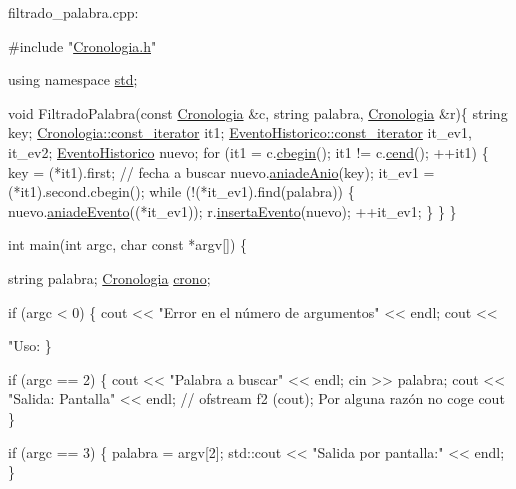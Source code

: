  filtrado\+\_\+palabra.\+cpp\+: 
\begin{DoxyCodeInclude}

\textcolor{preprocessor}{#include "\hyperlink{Cronologia_8h}{Cronologia.h}"}

\textcolor{keyword}{using namespace }\hyperlink{namespacestd}{std};

\textcolor{keywordtype}{void} FiltradoPalabra(\textcolor{keyword}{const} \hyperlink{classCronologia}{Cronologia} &c, \textcolor{keywordtype}{string} palabra, \hyperlink{classCronologia}{Cronologia} &r)\{
  \textcolor{keywordtype}{string} key;
  \hyperlink{classCronologia_1_1const__iterator}{Cronologia::const\_iterator} it1;
  \hyperlink{classEventoHistorico_1_1const__iterator}{EventoHistorico::const\_iterator} it\_ev1, it\_ev2;
  \hyperlink{classEventoHistorico}{EventoHistorico} nuevo;
  \textcolor{keywordflow}{for} (it1 = c.\hyperlink{classCronologia_a7457f94493f66fdd906f9c2cae44732b}{cbegin}(); it1 != c.\hyperlink{classCronologia_afc9925e321be957f47312184af813d09}{cend}(); ++it1) \{
    key = (*it1).first;         \textcolor{comment}{// fecha a buscar}
    nuevo.\hyperlink{classEventoHistorico_ad7bb99f4afa1b283f965a5ed378a5c14}{aniadeAnio}(key);
    it\_ev1 = (*it1).second.cbegin();
    \textcolor{keywordflow}{while} (!(*it\_ev1).find(palabra)) \{
      nuevo.\hyperlink{classEventoHistorico_aedda8393e5c52b32ee3c3a5cbd58ab37}{aniadeEvento}((*it\_ev1));
      r.\hyperlink{classCronologia_a006c5d809c17d50d255bb5b6456a4776}{insertaEvento}(nuevo);
      ++it\_ev1;
    \}
  \}
\}

\textcolor{keywordtype}{int} main(\textcolor{keywordtype}{int} argc, \textcolor{keywordtype}{char} \textcolor{keyword}{const} *argv[]) \{

  \textcolor{keywordtype}{string} palabra;
  \hyperlink{classCronologia}{Cronologia} \hyperlink{classCronologia_a5ba99beab3de21fd9c1c4c3555839d76}{crono};

  \textcolor{keywordflow}{if} (argc < 0) \{
    cout << \textcolor{stringliteral}{"Error en el número de argumentos"} << endl;
    cout << \textcolor{stringliteral}{"Uso: %
  \}

  \textcolor{keywordflow}{if} (argc == 2) \{
    cout << \textcolor{stringliteral}{"Palabra a buscar"} << endl;
    cin >> palabra;
    cout << \textcolor{stringliteral}{"Salida: Pantalla"} << endl;
\textcolor{comment}{// ofstream f2 (cout); Por alguna razón no coge cout}
  \}

  \textcolor{keywordflow}{if} (argc == 3) \{
    palabra = argv[2];
    std::cout << \textcolor{stringliteral}{"Salida por pantalla:"} << endl;
  \}

}
\end{DoxyCodeInclude}
